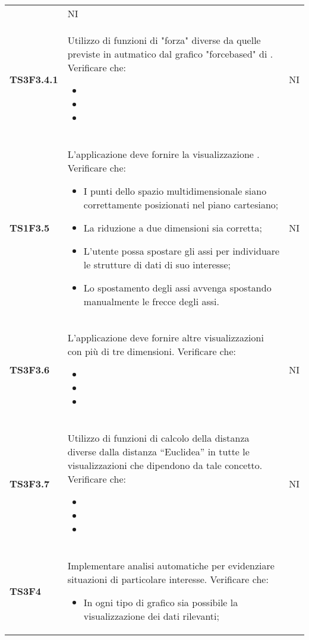 \begin{longtable}{C{2.5cm} | C{12cm} C{2cm}}
\begin{itemize}
					\end{itemize}	
				 & NI \\
\textbf{TS3F3.4.1} & Utilizzo di funzioni di "forza" diverse da quelle previste in autmatico dal grafico "forcebased" di .
Verificare che:
					\begin{itemize}
						\item 
						\item 
						\item 
					\end{itemize}	
				   & NI \\
\textbf{TS1F3.5} & L'applicazione deve fornire la visualizzazione . Verificare che:
					\begin{itemize}
						\item I punti dello spazio multidimensionale siano correttamente posizionati nel piano cartesiano;
						\item La riduzione a due dimensioni sia corretta;
						\item L'utente possa spostare gli assi per individuare le strutture di dati di suo interesse;
						\item Lo spostamento degli assi avvenga spostando manualmente le frecce degli assi.
					\end{itemize}	
				   & NI \\
\textbf{TS3F3.6} & L'applicazione deve fornire altre visualizzazioni con più di tre dimensioni. Verificare che:
					\begin{itemize}
						\item 
						\item 
						\item 
					\end{itemize}	
				   & NI \\
\textbf{TS3F3.7} & Utilizzo di funzioni di calcolo della distanza diverse dalla distanza “Euclidea” in tutte le visualizzazioni che dipendono da tale concetto. Verificare che:
					\begin{itemize}
						\item 
						\item 
						\item 
					\end{itemize}	
				   & NI \\
\textbf{TS3F4} & Implementare analisi automatiche per evidenziare situazioni di particolare interesse. Verificare che: 
					\begin{itemize}
						\item In ogni tipo di grafico sia possibile la visualizzazione dei dati rilevanti;

\end{itemize}
\end{longtable}
